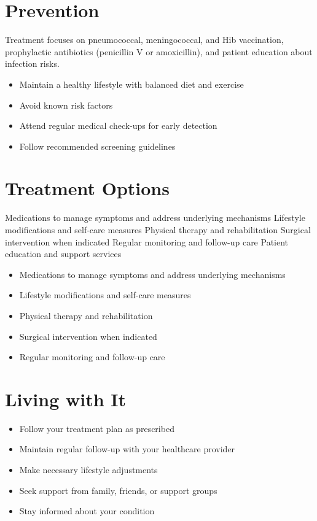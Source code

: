 \section{Prevention}
Treatment focuses on pneumococcal, meningococcal, and Hib vaccination, prophylactic antibiotics (penicillin V or amoxicillin), and patient education about infection risks.

\begin{itemize}[noitemsep]
  \item Maintain a healthy lifestyle with balanced diet and exercise
  \item Avoid known risk factors
  \item Attend regular medical check-ups for early detection
  \item Follow recommended screening guidelines
\end{itemize}
\section{Treatment Options}
Medications to manage symptoms and address underlying mechanisms Lifestyle modifications and self-care measures Physical therapy and rehabilitation Surgical intervention when indicated Regular monitoring and follow-up care Patient education and support services

\begin{itemize}[noitemsep]
  \item Medications to manage symptoms and address underlying mechanisms
  \item Lifestyle modifications and self-care measures
  \item Physical therapy and rehabilitation
  \item Surgical intervention when indicated
  \item Regular monitoring and follow-up care
\end{itemize}
\section{Living with It}
\begin{itemize}[noitemsep]
  \item Follow your treatment plan as prescribed
  \item Maintain regular follow-up with your healthcare provider
  \item Make necessary lifestyle adjustments
  \item Seek support from family, friends, or support groups
  \item Stay informed about your condition
\end{itemize}
